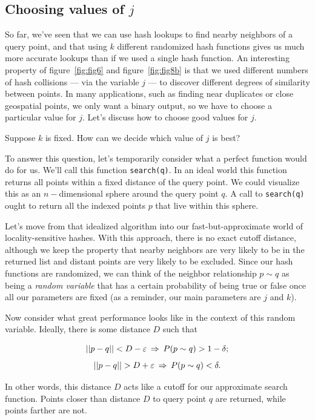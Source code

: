 \documentclass[20pt,]{extarticle}
\begin{document}
\subsection{\texorpdfstring{Choosing values of
\(j\)}{Choosing values of j}}\label{choosing-values-of-j}

So far, we've seen that we can use hash lookups to find nearby neighbors
of a query point, and that using \(k\) different randomized hash
functions gives us much more accurate lookups than if we used a single
hash function. An interesting property of figure~\ref{fig:fig6} and
figure~\ref{fig:fig8b} is that we used different numbers of hash
collisions --- via the variable \(j\) --- to discover different degrees
of similarity between points. In many applications, such as finding near
duplicates or close geospatial points, we only want a binary output, so
we have to choose a particular value for \(j\). Let's discuss how to
choose good values for \(j.\)

Suppose \(k\) is fixed. How can we decide which value of \(j\) is best?

To answer this question, let's temporarily consider what a perfect
function would do for us. We'll call this function \texttt{search(q)}.
In an ideal world this function returns all points within a fixed
distance of the query point. We could visualize this as an
\(n-\)dimensional sphere around the query point \(q\). A call to
\texttt{search(q)} ought to return all the indexed points \(p\) that
live within this sphere.

Let's move from that idealized algorithm into our fast-but-approximate
world of locality-sensitive hashes. With this approach, there is no
exact cutoff distance, although we keep the property that nearby
neighbors are very likely to be in the returned list and distant points
are very likely to be excluded. Since our hash functions are randomized,
we can think of the neighbor relationship \(p\sim q\) as being a
\emph{random variable} that has a certain probability of being true or
false once all our parameters are fixed (as a reminder, our main
parameters are \(j\) and \(k\)).

Now consider what great performance looks like in the context of this
random variable. Ideally, there is some distance \(D\) such that

\[||p-q|| < D-\varepsilon \quad{\hskip -0.8em}\Rightarrow\quad{\hskip -0.8em} P(p\sim q) > 1 - \delta;\]
\[||p-q|| > D+\varepsilon \quad{\hskip -0.8em}\Rightarrow\quad{\hskip -0.8em} P(p\sim q) < \delta.\]

In other words, this distance \(D\) acts like a cutoff for our
approximate search function. Points closer than distance \(D\) to query
point \(q\) are returned, while points farther are not.
\end{document}
